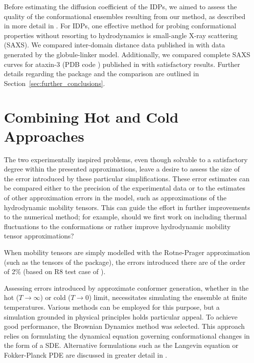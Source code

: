 \documentclass{doctoral}
\newcommand{\code}[1]{\texttt{\detokenize{#1}}}
\begin{document}
Before estimating the diffusion coefficient of the IDPs, we aimed to assess the quality of the conformational ensembles resulting from our method, as described in more detail in \textcite{Waszkiewicz_2024_mda}. For IDPs, one effective method for probing conformational properties without resorting to hydrodynamics is small-angle X-ray scattering (SAXS). We compared inter-domain distance data published in \textcite{Rozycki_2022} with data generated by the globule-linker model. Additionally, we compared complete SAXS curves for ataxin-3 (PDB code \code{1yzb}) published in \cite{Lin_2017} with satisfactory results. Further details regarding the \code{saxs_single_bead} package and the comparison are outlined in Section~\ref{sec:further_conclusions}.

\section{Combining Hot and Cold Approaches}
\label{sec:combining_hot_and_cold_approaches}
The two experimentally inspired problems, even though solvable to a satisfactory degree within the presented approximations, leave a desire to assess the size of the error introduced by these particular simplifications. These error estimates can be compared either to the precision of the experimental data or to the estimates of other approximation errors in the model, such as approximations of the hydrodynamic mobility tensors. This can guide the effort in further improvements to the numerical method; for example, should we first work on including thermal fluctuations to the conformations or rather improve hydrodynamic mobility tensor approximations?

When mobility tensors are simply modelled with the Rotne-Prager approximation (such as the tensors of the \code{pygrpy} package), the errors introduced there are of the order of 2\% (based on R8 test case of \cite{Zuk_2018}).

Assessing errors introduced by approximate conformer generation, whether in the hot ($T\to\infty$) or cold ($T\to0$) limit, necessitates simulating the ensemble at finite temperatures. Various methods can be employed for this purpose, but a simulation grounded in physical principles holds particular appeal. To achieve good performance, the Brownian Dynamics method was selected. This approach relies on formulating the dynamical equation governing conformational changes in the form of a SDE. Alternative formulations such as the Langevin equation or Fokker-Planck PDE are discussed in greater detail in \textcite{Waszkiewicz_2023_pychastic}.
\end{document}
